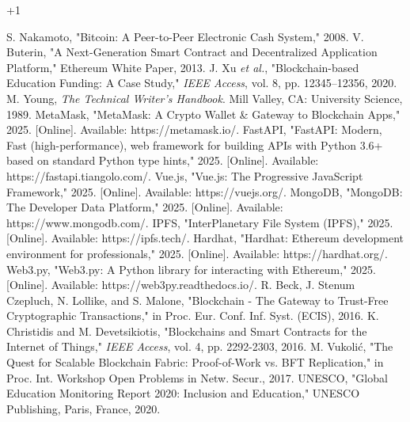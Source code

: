 +1\documentclass[conference]{IEEEtran}
\begin{document}
\begin{thebibliography}{00}
 S. Nakamoto, "Bitcoin: A Peer-to-Peer Electronic Cash System," 2008.
 V. Buterin, "A Next-Generation Smart Contract and Decentralized Application Platform," Ethereum White Paper, 2013.
 J. Xu \textit{et al.}, "Blockchain-based Education Funding: A Case Study," \textit{IEEE Access}, vol. 8, pp. 12345--12356, 2020.
 M. Young, \textit{The Technical Writer's Handbook}. Mill Valley, CA: University Science, 1989.
 MetaMask, "MetaMask: A Crypto Wallet \& Gateway to Blockchain Apps," 2025. [Online]. Available: https://metamask.io/.
 FastAPI, "FastAPI: Modern, Fast (high-performance), web framework for building APIs with Python 3.6+ based on standard Python type hints," 2025. [Online]. Available: https://fastapi.tiangolo.com/.
 Vue.js, "Vue.js: The Progressive JavaScript Framework," 2025. [Online]. Available: https://vuejs.org/.
 MongoDB, "MongoDB: The Developer Data Platform," 2025. [Online]. Available: https://www.mongodb.com/.
 IPFS, "InterPlanetary File System (IPFS)," 2025. [Online]. Available: https://ipfs.tech/.
 Hardhat, "Hardhat: Ethereum development environment for professionals," 2025. [Online]. Available: https://hardhat.org/.
 Web3.py, "Web3.py: A Python library for interacting with Ethereum," 2025. [Online]. Available: https://web3py.readthedocs.io/.
 R. Beck, J. Stenum Czepluch, N. Lollike, and S. Malone, "Blockchain - The Gateway to Trust-Free Cryptographic Transactions," in Proc. Eur. Conf. Inf. Syst. (ECIS), 2016.
 K. Christidis and M. Devetsikiotis, "Blockchains and Smart Contracts for the Internet of Things," \textit{IEEE Access}, vol. 4, pp. 2292-2303, 2016.
 M. Vukolić, "The Quest for Scalable Blockchain Fabric: Proof-of-Work vs. BFT Replication," in Proc. Int. Workshop Open Problems in Netw. Secur., 2017.
 UNESCO, "Global Education Monitoring Report 2020: Inclusion and Education," UNESCO Publishing, Paris, France, 2020.
\end{thebibliography}
\end{document}
